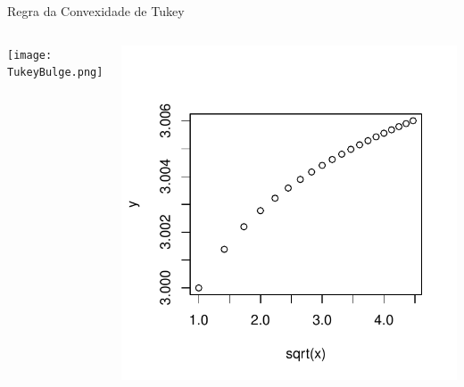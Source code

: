 \documentclass{beamer}\usepackage[]{graphicx}\usepackage[]{color}
\newenvironment{knitrout}{}{} %
\renewenvironment{knitrout}{\setlength{\topsep}{0mm}}{}
\begin{document}
\begin{frame}{Regra da Convexidade de Tukey}

\begin{columns}[c]

\centering
\texttt{[image: TukeyBulge.png]}

\centering
\begin{knitrout}
\color{fgcolor}
\includegraphics[width=0.7\linewidth]{figure/rem7-1} 

\end{knitrout}

\end{columns}

\end{frame}
\end{document}

